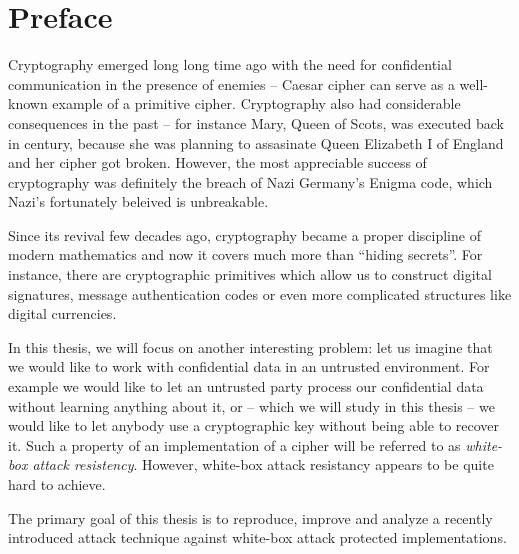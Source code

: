 \cleardoublepage{}

\chapter*{Preface}


Cryptography emerged long long time ago with the need for confidential communication in the presence of enemies -- Caesar cipher can serve as a well-known example of a primitive cipher. Cryptography also had considerable consequences in the past -- for instance Mary, Queen of Scots, was executed back in  century, because she was planning to assasinate Queen Elizabeth I of England and her cipher got broken. However, the most appreciable success of cryptography was definitely the breach of Nazi Germany's Enigma code, which Nazi's fortunately beleived is unbreakable.

Since its revival few decades ago, cryptography became a proper discipline of modern mathematics and now it covers much more than ``hiding secrets''. For instance, there are cryptographic primitives which allow us to construct digital signatures, message authentication codes or even more complicated structures like digital currencies.

In this thesis, we will focus on another interesting problem: let us imagine that we would like to work with confidential data in an untrusted environment. For example we would like to let an untrusted party process our confidential data without learning anything about it, or -- which we will study in this thesis -- we would like to let anybody use a cryptographic key without being able to recover it. Such a property of an implementation of a cipher will be referred to as {\em white-box attack resistency}. However, white-box attack resistancy appears to be quite hard to achieve.

The primary goal of this thesis is to reproduce, improve and analyze a recently introduced attack technique against white-box attack protected implementations.



